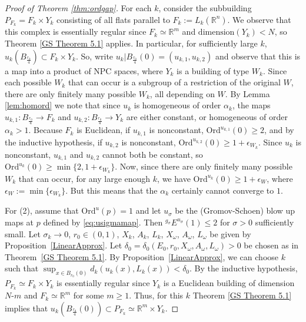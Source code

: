 \documentclass[12pt]{amsart}
\theoremstyle{definition}
\numberwithin{equation}{section}
\newcommand{\R}{\mathbb R}
\begin{document}
\begin{proof}[Proof of Theorem \ref{thm:ordgap}]
\newcommand{\Ord}{\text{Ord}}
For each $k$, consider the subbuilding $P_{F_k}=F_k\times Y_k$ consisting of all flats parallel to $F_k:= L_k(\R^n)$.  We observe that this complex is essentially regular since $F_k \simeq \R^m$ and $\text{dimension}(Y_k)<N$, so Theorem \ref{GS Theorem 5.1} applies.  In particular, for sufficiently large $k$, $u_k(B_{\frac{r_0}4})\subset F_k\times Y_k$. So, write $u_k|B_{\frac{r_0}4}(0)=(u_{k,1},u_{k,2})$ and observe that this is a map into a product of NPC spaces, where $Y_k$ is a building of type $W_k$. Since each possible $W_k$ that can occur is a subgroup of a restriction of the original $W$, there are only finitely many possible $W_k$, all depending on $W$. By Lemma \ref{lem:homord} we note that since $u_k$ is homogeneous of order $\alpha_k$, the maps $u_{k,1}:B_{\frac{r_0}4}\to F_k$ and $u_{k,2}:B_{\frac{r_0}4}\to Y_k$ are either constant, or homogeneous of order $\alpha_k>1$. Because $F_k$ is Euclidean, if $u_{k,1}$ is nonconstant, $\Ord^{u_{k,1}}(0)\geq2$, and by the inductive hypothesis, if $u_{k,2}$ is nonconstant, $\Ord^{u_{k,2}}(0)\geq1+\epsilon_{W_k}$. Since $u_k$ is nonconstant, $u_{k,1}$ and $u_{k,2}$ cannot both be constant, so $\Ord^{u_k}(0)\geq\min\{2,1+\epsilon_{W_k}\}$.  Now, since there are only finitely many possible $W_k$ that can occur, for any large enough $k$, we have $\Ord^{u_k}(0)\geq1+\epsilon_W$, where $\epsilon_W:=\min\{\epsilon_{W_k}\}$.  But this means that the $\alpha_k$ certainly cannot converge to $1$.
 

For (2), assume that $\text{Ord}^u(p)=1$ and let $u_\sigma$ be the (Gromov-Schoen) blow up maps at $p$  defined by \eqref{eq:usigmamap}.  Then $^{g_\sigma}E^{u_\sigma}(1) \leq 2$ for $\sigma>0$ sufficiently small.  Let $\sigma_k \rightarrow 0$, $r_0 \in (0,1)$, $X_k$, $A_k$, $L_k$, $X_\omega$, $A_\omega$, $L_\omega$ be given by Proposition~\ref{LinearApprox}.    Let $\delta_0=\delta_0(E_0,r_0,X_\omega,A_\omega,L_\omega)>0$ be chosen as in Theorem~\ref{GS Theorem 5.1}.  By Proposition~\ref{LinearApprox}, we can choose $k$ such that  $\sup_{x \in B_{r_0}(0)} d_k(u_k(x),L_k(x))<\delta_0$.  By the inductive hypothesis, $P_{F_k}\simeq F_k \times Y_k$ is essentially regular since $Y_k$ is a Euclidean building of dimension $N\text{-}m$ and $F_k \simeq \R^m$ for some $m\geq 1$. Thus, for this $k$ Theorem \ref{GS Theorem 5.1} implies that $u_k(B_{\frac{r_0}4}(0)) \subset P_{F_k}\simeq \R^m  \times Y_k$.  


\end{proof}
\end{document}
